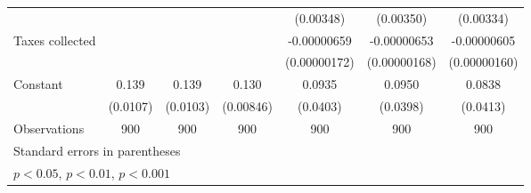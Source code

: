 {\begin{tabular}{l*{6}{c}}
                    &                     &                     &                     &   (0.00348)         &   (0.00350)         &   (0.00334)         \\
[1em]
Taxes collected     &                     &                     &                     & -0.00000659\sym{***}& -0.00000653\sym{***}& -0.00000605\sym{***}\\
                    &                     &                     &                     &(0.00000172)         &(0.00000168)         &(0.00000160)         \\
[1em]
Constant            &       0.139\sym{***}&       0.139\sym{***}&       0.130\sym{***}&      0.0935\sym{*}  &      0.0950\sym{*}  &      0.0838\sym{*}  \\
                    &    (0.0107)         &    (0.0103)         &   (0.00846)         &    (0.0403)         &    (0.0398)         &    (0.0413)         \\
\hline
Observations        &         900         &         900         &         900         &         900         &         900         &         900         \\
\hline\hline
\multicolumn{7}{l}{\footnotesize Standard errors in parentheses}\\
\multicolumn{7}{l}{\footnotesize \sym{*} \(p<0.05\), \sym{**} \(p<0.01\), \sym{***} \(p<0.001\)}\\
\end{tabular}
}
